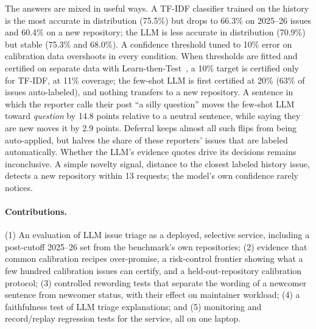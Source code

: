 The answers are mixed in useful ways. A TF-IDF classifier trained on the history is the most accurate
in distribution (75.5\%) but drops to 66.3\% on 2025--26 issues and 60.4\% on a new repository; the
LLM is less accurate in distribution (70.9\%) but stable (75.3\% and 68.0\%). A confidence threshold
tuned to 10\% error on calibration data overshoots in every condition. When thresholds are fitted and
certified on separate data with Learn-then-Test~\cite{angelopoulos2021ltt}, a 10\% target is
certified only for TF-IDF, at 11\% coverage; the few-shot LLM is first certified at 20\% (63\% of issues
auto-labeled), and nothing transfers to a new repository. A sentence in which the reporter calls
their post ``a silly question'' moves the few-shot LLM toward \emph{question} by 14.8 points relative
to a neutral sentence, while saying they are new moves it by 2.9 points. Deferral keeps almost all
such flips from being auto-applied, but halves the share of these reporters' issues that are labeled
automatically. Whether the LLM's evidence quotes drive its decisions remains inconclusive. A simple
novelty signal, distance to the closest labeled history issue, detects a new repository within 13
requests; the model's own confidence rarely notices.

\paragraph{Contributions.} (1) An evaluation of LLM issue triage as a deployed, selective service,
including a post-cutoff 2025--26 set from the benchmark's own repositories; (2) evidence that common
calibration recipes over-promise, a risk-control frontier showing what a few hundred calibration
issues can certify, and a held-out-repository calibration protocol; (3) controlled rewording tests
that separate the wording of a newcomer sentence from newcomer status, with their effect on
maintainer workload; (4) a faithfulness test of LLM triage explanations; and (5) monitoring and record/replay
regression tests for the service, all on one laptop.
